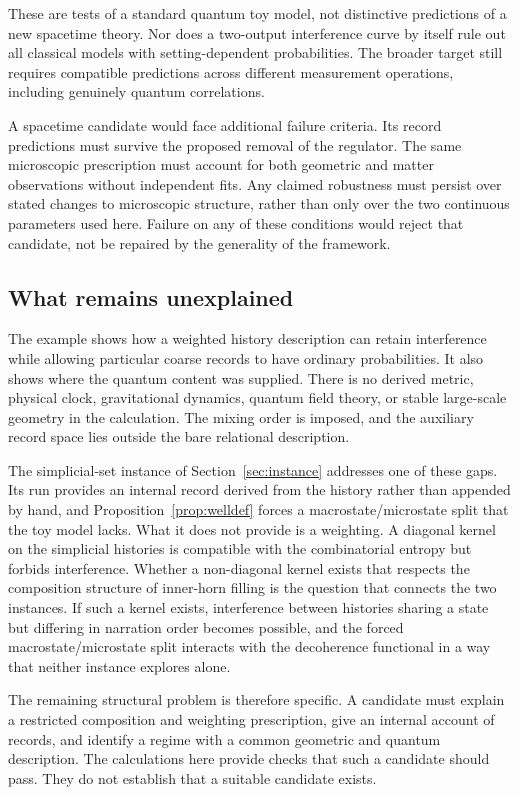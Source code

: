 These are tests of a standard quantum toy model, not distinctive predictions
of a new spacetime theory. Nor does a two-output interference curve by
itself rule out all classical models with setting-dependent probabilities.
The broader target still requires compatible predictions across different
measurement operations, including genuinely quantum correlations.

A spacetime candidate would face additional failure criteria. Its record
predictions must survive the proposed removal of the regulator. The same
microscopic prescription must account for both geometric and matter
observations without independent fits. Any claimed robustness must persist
over stated changes to microscopic structure, rather than only over the
two continuous parameters used here. Failure on any of these conditions
would reject that candidate, not be repaired by the generality of the
framework.

\subsection{What remains unexplained}

The example shows how a weighted history description can retain
interference while allowing particular coarse records to have ordinary
probabilities. It also shows where the quantum content was supplied.
There is no derived metric, physical clock, gravitational dynamics,
quantum field theory, or stable large-scale geometry in the calculation.
The mixing order is imposed, and the auxiliary record space lies outside
the bare relational description.

The simplicial-set instance of Section~\ref{sec:instance} addresses one
of these gaps. Its run provides an internal record derived from the
history rather than appended by hand, and
Proposition~\ref{prop:welldef} forces a macrostate/microstate split
that the toy model lacks. What it does not provide is a weighting.
A diagonal kernel on the simplicial histories is compatible with the
combinatorial entropy but forbids interference. Whether a non-diagonal
kernel exists that respects the composition structure of inner-horn
filling is the question that connects the two instances. If such a
kernel exists, interference between histories sharing a state but
differing in narration order becomes possible, and the forced
macrostate/microstate split interacts with the decoherence functional
in a way that neither instance explores alone.

The remaining structural problem is therefore specific. A candidate must
explain a restricted composition and weighting prescription, give an
internal account of records, and identify a regime with a common geometric
and quantum description. The calculations here provide checks that such
a candidate should pass. They do not establish that a suitable candidate
exists.
